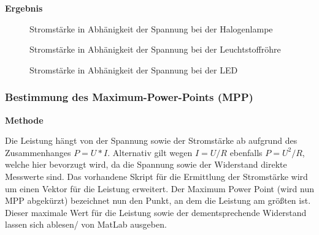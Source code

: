         \vspace{5mm}
        \textbf{Ergebnis}
        \newline
        
        \begin{figure}[H]
            \def\svgwidth{\textwidth}
            
            
            \caption{Stromstärke in Abhänigkeit der Spannung bei der Halogenlampe}
        \end{figure}
        
        \begin{figure}[H]
            \def\svgwidth{\textwidth}
            
            
            \caption{Stromstärke in Abhänigkeit der Spannung bei der Leuchtstoffröhre}
        \end{figure}
        
        \begin{figure}[H]
            \def\svgwidth{\textwidth}
            
            
            \caption{Stromstärke in Abhänigkeit der Spannung bei der LED}
        \end{figure}

    \subsubsection{Bestimmung des Maximum-Power-Points (MPP)}           %
        \textbf{Methode}
        \newline
        \par Die Leistung hängt von der Spannung sowie der Stromstärke ab aufgrund des Zusammenhanges $P=U*I$. Alternativ gilt wegen $I=U/R$ ebenfalls $P=U^2/R$, welche hier bevorzugt wird, da die Spannung sowie der Widerstand direkte Messwerte sind. Das vorhandene Skript für die Ermittlung der Stromstärke wird um einen Vektor für die Leistung erweitert.
        Der Maximum Power Point (wird nun MPP abgekürzt) bezeichnet nun den Punkt, an dem die Leistung am größten ist. Dieser maximale Wert für die Leistung sowie der dementsprechende Widerstand lassen sich ablesen/ von MatLab ausgeben. 
        
